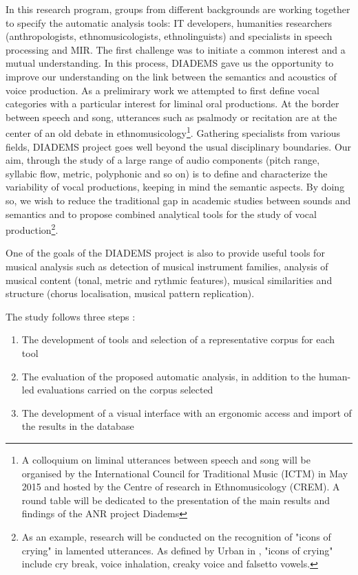 \documentclass{sig-alternate}
\begin{document}
In this research program, groups from different backgrounds are working together to specify the automatic analysis tools:  IT developers, humanities researchers (anthropologists, ethnomusicologists, ethnolinguists) and specialists in speech processing and MIR. The first challenge was to initiate a common interest and a mutual understanding. In this process, DIADEMS gave us the opportunity  to improve our understanding on the link between the semantics and acoustics of voice production. As a prelimirary work we attempted to first define vocal categories with a particular interest for liminal oral productions. At the border between speech and song, utterances such as psalmody or recitation are at the center of an old debate in ethnomusicology\footnote{A colloquium on liminal utterances between speech and song will be organised by the International Council for Traditional Music (ICTM) in May 2015 and hosted by the Centre of research in Ethnomusicology (CREM). A round table will be dedicated to the presentation of the main results and findings of the ANR project Diadems}. Gathering specialists from various fields, DIADEMS project goes well beyond the usual disciplinary boundaries. Our aim, through the study of a large range of audio components (pitch range, syllabic flow, metric, polyphonic and so on) is to define and characterize the variability of vocal productions, keeping in mind the semantic aspects. By doing so, we wish to reduce the traditional gap in academic studies between sounds and semantics and to propose combined analytical tools for the study of vocal production\footnote{As an example, research will be conducted on the recognition of "icons of crying" 
in lamented utterances. As defined by Urban in \cite{Urban88}, "icons of crying" include cry break, voice inhalation, creaky voice and falsetto vowels.}. 

One of the goals of the DIADEMS project is also to provide useful tools for musical analysis such as detection of musical instrument families, analysis of musical content (tonal, metric and rythmic features), musical similarities and structure (chorus localisation, musical pattern replication).

The study follows three steps : 
\begin{enumerate}
\item The development of tools and selection of a representative corpus
  for each tool
\item The evaluation of the proposed automatic analysis, in addition to
  the human-led evaluations carried on the corpus selected
\item The development of a visual interface with an ergonomic access and
  import of the results in the database
\end{enumerate}
\end{document}
